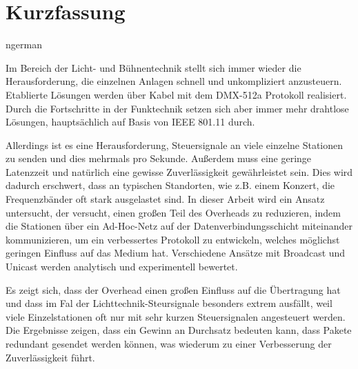 \documentclass[]{ccs-thesis}
\begin{document}
\chapter*{Kurzfassung}
\begin{otherlanguage*}{ngerman}

Im Bereich der Licht- und Bühnentechnik stellt sich immer wieder die Herausforderung, 
die einzelnen Anlagen schnell und unkompliziert anzusteuern. 
Etablierte Lösungen werden über Kabel mit dem DMX-512a Protokoll realisiert. 
Durch die Fortschritte in der Funktechnik setzen sich aber immer mehr drahtlose Lösungen, 
hauptsächlich auf Basis von IEEE 801.11 durch. 

Allerdings ist es eine Herausforderung, Steuersignale an viele einzelne Stationen zu senden 
und dies mehrmals pro Sekunde.
Außerdem muss eine geringe Latenzzeit und natürlich eine gewisse Zuverlässigkeit gewährleistet sein.
Dies wird dadurch erschwert, dass an typischen Standorten, wie z.B. einem Konzert, 
die Frequenzbänder oft stark ausgelastet sind. 
In dieser Arbeit wird ein Ansatz untersucht, der versucht, einen großen Teil des Overheads zu reduzieren,
indem die Stationen über ein Ad-Hoc-Netz auf der Datenverbindungsschicht miteinander kommunizieren,
um ein verbessertes Protokoll zu entwickeln, welches möglichst geringen Einfluss auf das Medium hat.
Verschiedene Ansätze mit Broadcast und Unicast werden analytisch und experimentell bewertet.

Es zeigt sich, dass der Overhead einen großen Einfluss auf die Übertragung hat 
und dass im Fal der Lichttechnik-Steursignale besonders extrem ausfällt,
weil viele Einzelstationen oft nur mit sehr kurzen Steuersignalen angesteuert werden.
Die Ergebnisse zeigen, dass ein Gewinn an Durchsatz bedeuten kann, 
dass Pakete redundant gesendet werden können,
was wiederum zu einer Verbesserung der Zuverlässigkeit führt.

\end{otherlanguage*}
\acresetall

\cleardoublepage
\tableofcontents

\cleardoublepage
{}












% 

\cleardoublepage

\listofabbreviations
\clearpage

\listoffigures
\clearpage

\listoftables
\clearpage

\lstlistoflistings
\clearpage

\printbibliography
\end{document}
